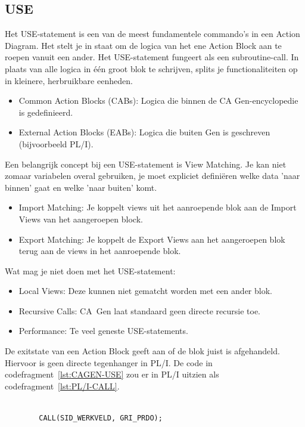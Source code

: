 \subsection{USE}
Het USE-statement is een van de meest fundamentele commando's in een Action Diagram. Het stelt je in staat om de logica van het ene Action Block aan te roepen vanuit een ander. Het USE-statement fungeert als een subroutine-call. In plaats van alle logica in één groot blok te schrijven, splits je functionaliteiten op in kleinere, herbruikbare eenheden.
\begin{itemize}
    \item Common Action Blocks (CABs): Logica die binnen de CA Gen-encyclopedie is gedefinieerd.
    \item External Action Blocks (EABs): Logica die buiten Gen is geschreven (bijvoorbeeld PL/I).
\end{itemize}
Een belangrijk concept bij een USE-statement is View Matching. Je kan niet zomaar variabelen overal gebruiken, je moet expliciet definiëren welke data 'naar binnen' gaat en welke 'naar buiten' komt.
\begin{itemize}
    \item Import Matching: Je koppelt views uit het aanroepende blok aan de Import Views van het aangeroepen block.
    \item Export Matching: Je koppelt de Export Views aan het aangeroepen blok terug aan de views in het aanroepende blok.
\end{itemize}
Wat mag je niet doen met het USE-statement:
\begin{itemize}
    \item Local Views: Deze kunnen niet gematcht worden met een ander blok.
    \item Recursive Calls: CA~Gen laat standaard geen directe recursie toe.
    \item Performance: Te veel geneste USE-statements.
\end{itemize}
De exitstate van een Action Block geeft aan of de blok juist is afgehandeld. Hiervoor is geen directe tegenhanger in PL/I.
De code in codefragment~\ref{lst:CAGEN-USE} zou er in PL/I uitzien als codefragment~\ref{lst:PL/I-CALL}.

\begin{listing}[h]
    \caption[Voorbeeld PL/I CALL]{Voorbeeld PL/I CALL}
    \label{lst:PL/I-CALL}
    \begin{verbatim}
        
        CALL(SID_WERKVELD, GRI_PRDO);
        
    \end{verbatim}
\end{listing}


